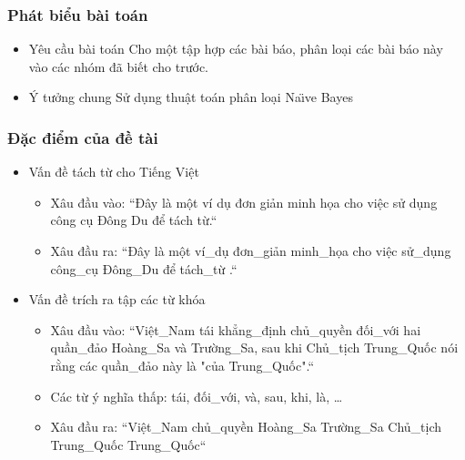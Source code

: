 \begin{frame}
  \frametitle{Phát biểu bài toán}
  \begin{itemize}[<+->]
    \item
    \begin{block}{Yêu cầu bài toán}
      Cho một tập hợp các bài báo, phân loại các bài báo này vào các nhóm đã biết cho trước.
    \end{block}
  
    \item
    \begin{block}{Ý tưởng chung}
      Sử dụng thuật toán phân loại Na\"\i ve Bayes
    \end{block}
    \end{itemize}

\end{frame}

\begin{frame}
  \frametitle{Đặc điểm của đề tài}
  \begin{itemize}[<+->]
    \item Vấn đề tách từ cho Tiếng Việt
      \begin{itemize}[<+->]
        \item Xâu đầu vào: ``Đây là một ví dụ đơn giản minh họa cho việc sử dụng công cụ Đông Du để tách từ.``
        \item Xâu đầu ra:  ``Đây là một ví\_dụ đơn\_giản minh\_họa cho việc sử\_dụng công\_cụ Đông\_Du để tách\_từ .``
      \end{itemize}
    \item Vấn đề trích ra tập các từ khóa
      \begin{itemize}[<+->]
        \item Xâu đầu vào: ``Việt\_Nam tái khẳng\_định chủ\_quyền đối\_với hai quần\_đảo Hoàng\_Sa và Trường\_Sa, sau khi Chủ\_tịch Trung\_Quốc nói rằng các quần\_đảo này là "của Trung\_Quốc".``
        \item Các từ ý nghĩa thấp: tái, đối\_với, và, sau, khi, là, \ldots
        \item Xâu đầu ra:  ``Việt\_Nam chủ\_quyền Hoàng\_Sa Trường\_Sa Chủ\_tịch Trung\_Quốc Trung\_Quốc``
      \end{itemize}
    \end{itemize}
\end{frame}
